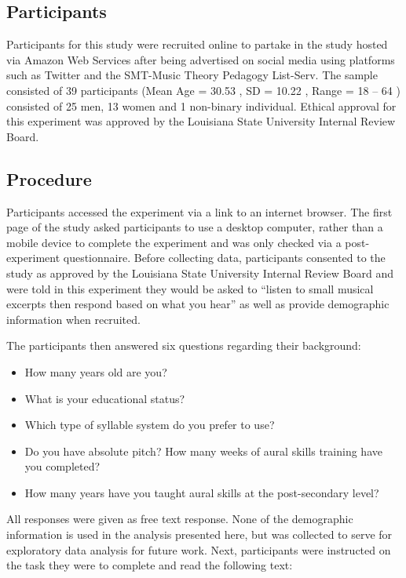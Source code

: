 \documentclass[english,man,floatsintext]{apa6}
\providecommand{\tightlist}{%
  \setlength{\itemsep}{0pt}\setlength{\parskip}{0pt}}
\begin{document}
\hypertarget{participants}{%
\subsection{Participants}\label{participants}}

Participants for this study were recruited online to partake in the study hosted via Amazon Web Services after being advertised on social media using platforms such as Twitter and the SMT-Music Theory Pedagogy List-Serv.
The sample consisted of 39 participants (Mean Age = 30.53 , SD = 10.22 , Range = 18 -- 64 ) consisted of 25 men, 13 women and 1 non-binary individual.
Ethical approval for this experiment was approved by the Louisiana State University Internal Review Board.

\hypertarget{procedure}{%
\subsection{Procedure}\label{procedure}}

Participants accessed the experiment via a link to an internet browser.
The first page of the study asked participants to use a desktop computer, rather than a mobile device to complete the experiment and was only checked via a post-experiment questionnaire.
Before collecting data, participants consented to the study as approved by the Louisiana State University Internal Review Board and were told in this experiment they would be asked to \enquote{listen to small musical excerpts then respond based on what you hear} as well as provide demographic information when recruited.

The participants then answered six questions regarding their background:

\begin{itemize}
\tightlist
\item
  How many years old are you?
\item
  What is your educational status?
\item
  Which type of syllable system do you prefer to use?
\item
  Do you have absolute pitch? How many weeks of aural skills training have you completed?
\item
  How many years have you taught aural skills at the post-secondary level?
\end{itemize}

All responses were given as free text response.
None of the demographic information is used in the analysis presented here, but was collected to serve for exploratory data analysis for future work.
Next, participants were instructed on the task they were to complete and read the following text:
\end{document}
